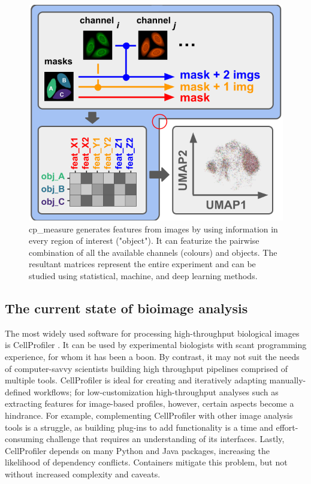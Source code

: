 \documentclass{article}
\begin{document}
\begin{figure}[htbp]
\centering
\includegraphics[width=.99\linewidth]{./figs/fig_1_tmp.png}
\caption{\label{fig:overview}cp\_measure generates features from images by using information in every region of interest ("object"). It can featurize the pairwise combination of all the available channels (colours) and objects. The resultant matrices represent the entire experiment and can be studied using statistical, machine, and deep learning methods.}
\end{figure}

\subsection{The current state of bioimage analysis}
\label{sec:org8f5b33d}
The most widely used software for processing high-throughput biological images is CellProfiler \citep{stirlingCellProfiler4Improvements2021}. It can be used by experimental biologists with scant programming experience, for whom it has been a boon. By contrast, it may not suit the needs of computer-savvy scientists building high throughput pipelines comprised of multiple tools. CellProfiler is ideal for creating and iteratively adapting manually-defined workflows; for low-customization high-throughput analyses such as extracting features for image-based profiles, however, certain aspects become a hindrance. For example, complementing CellProfiler with other image analysis tools is a struggle, as building plug-ins to add functionality is a time and effort-consuming challenge that requires an understanding of its interfaces. Lastly, CellProfiler depends on many Python and Java packages, increasing the likelihood of dependency conflicts. Containers mitigate this problem, but not without increased complexity and caveats.
\end{document}
